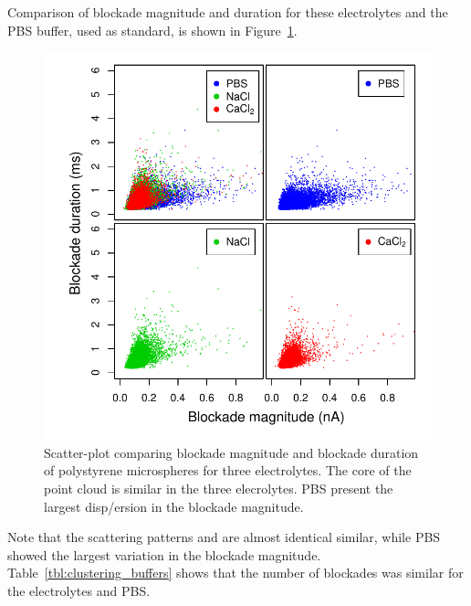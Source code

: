 \documentclass[journal=langd5,manuscript=article]{achemso}
\begin{document}
Comparison of 
blockade magnitude and duration 
for these electrolytes and the PBS buffer, used as standard, is shown in Figure~\ref{fgr:pairs_buffers}.
 \begin{figure}
  \includegraphics[width=\linewidth]{Figures/Pairs_buffers_MS.pdf}
  \caption{Scatter-plot comparing  blockade magnitude and blockade duration of  polystyrene microspheres for three electrolytes. The core of the point cloud is similar in the three elecrolytes. PBS  present the largest  disp/ersion in the blockade magnitude.} 
  \label{fgr:pairs_buffers}
\end{figure}
Note that  the scattering patterns   and  are almost identical  similar, while PBS showed the largest  variation in the blockade magnitude.
Table~\ref{tbl:clustering_buffers} shows that the number of blockades was similar for the electrolytes and PBS.


  
\end{document}
